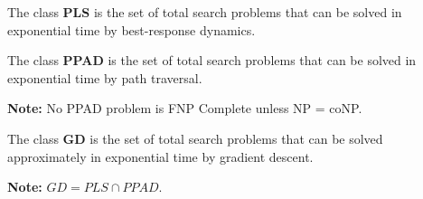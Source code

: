  	\begin{defn}[PLS]
 		The class \textbf{PLS} is the set of total search problems that can be solved in exponential time by best-response dynamics.
 	\end{defn}

 	\begin{defn}[PPAD]
 		The class \textbf{PPAD} is the set of total search problems that can be solved in exponential time by path traversal.
 	\end{defn}

 	\begin{marginfigure}
 		\textbf{Note: } No PPAD problem is FNP Complete unless NP = coNP.
 	\end{marginfigure}

 	\begin{defn}[GD]
 		The class \textbf{GD} is the set of total search problems that can be solved approximately in exponential time by gradient descent.
 	\end{defn}

 	\begin{marginfigure}
 		\textbf{Note: } $GD = PLS \cap PPAD$.
 	\end{marginfigure}